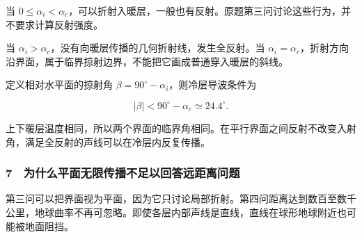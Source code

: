\documentclass[12pt,a4paper,fontset=fandol]{ctexart}
\begin{document}
当
\(0\le\alpha_i<\alpha_c\)，可以折射入暖层，一般也有反射。原题第三问讨论这些行为，并不要求计算反射强度。

当 \(\alpha_i>\alpha_c\)，没有向暖层传播的几何折射线，发生全反射。当
\(\alpha_i=\alpha_c\)，折射方向沿界面，属于临界掠射边界，不能把它画成普通穿入暖层的斜线。

\begin{center}
\begin{minipage}{\linewidth}
\centering\begingroup{}
\ifdim\wd\diagrambox>.88\linewidth
\sbox{\diagrambox}{\resizebox{.88\linewidth}{!}{\usebox{\diagrambox}}}\fi
\ifdim\ht\diagrambox>.38\textheight
\resizebox{!}{.38\textheight}{\usebox{\diagrambox}}
\else\usebox{\diagrambox}\fi
\par{}\endgroup\end{minipage}\end{center}

定义相对水平面的掠射角 \(\beta=90^\circ-\alpha_i\)，则冷层导波条件为

\[|\beta|<90^\circ-\alpha_c\simeq24.4^\circ.\]

上下暖层温度相同，所以两个界面的临界角相同。在平行界面之间反射不改变入射角，满足全反射的声线可以在冷层内反复传播。

\subsubsection{7　为什么平面无限传播不足以回答远距离问题}\label{ux4e3aux4ec0ux4e48ux5e73ux9762ux65e0ux9650ux4f20ux64adux4e0dux8db3ux4ee5ux56deux7b54ux8fdcux8dddux79bbux95eeux9898}

第三问可以把界面视为平面，因为它只讨论局部折射。第四问距离达到数百至数千公里，地球曲率不再可忽略。即使各层内部声线是直线，直线在球形地球附近也可能被地面阻挡。
\end{document}
